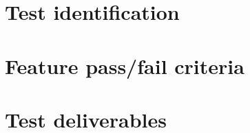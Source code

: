 \section{Test identification} \label{s:details-of-the-level-test-design:test-identification}
	\begin{comment}
		List the identifier and a brief description of each test case (or set of related test cases) in scenarios for
		this design. A particular test case, scenario, or procedure may be identified in more than one LTD. List
		the identifier and a brief description of each procedure associated with this LTD.
	\end{comment}

\section{Feature pass/fail criteria} \label{s:details-of-the-level-test-design:feature-pass-fail-criteria}
	\begin{comment}
		Specify the criteria to be used to determine whether the feature or feature combination has passed or
		failed. This is commonly based on the number of anomalies found in each severity category(s). This
		section is not needed if it is covered by an MTP and there have been no subsequent changes to the
		criteria.
	\end{comment}

\section{Test deliverables} \label{s:details-of-the-level-test-design:test-deliverables}
	\begin{comment}
		Identify all information that is to be delivered by the test activity (documents, data, etc.). The following
		documents may be included:
		⎯ Level Test Plan(s)
		⎯ Level Test Design(s)
		⎯ Level Test Cases
		⎯ Level Test Procedures
		⎯ Level Test Logs
		⎯ Anomaly Reports
		⎯ Level Interim Test Status Report(s)
		⎯ Level Test Report(s)
		⎯ Master Test Report
		Test input data and test output data may be identified as deliverables. Test tools may also be included.
		If documents have been combined or eliminated, then this list will be modified accordingly.
		Describe the process of delivering the completed information to the individuals (preferably by position,
		not name) and organizational entities that will need it. This may be a reference to a Configuration
		Management Plan. This delivery process description is not required if it is covered by the MTP and
		there are no changes
	\end{comment}